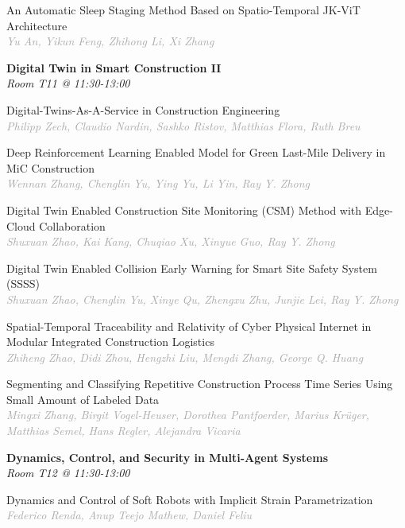 \begin{multicols*}{2}
\small An Automatic Sleep Staging Method Based on Spatio-Temporal JK-ViT Architecture\\ 
\footnotesize \textcolor{darkgray}{\textit{Yu An, Yikun  Feng, Zhihong  Li, Xi  Zhang}}

\normalsize \textbf{Digital Twin in Smart Construction II}\\
\small \textit{Room T11 @ 11:30-13:00}

\small Digital-Twins-As-A-Service in Construction Engineering\\ 
\footnotesize \textcolor{darkgray}{\textit{Philipp Zech, Claudio  Nardin, Sashko  Ristov, Matthias  Flora, Ruth  Breu}}

\small Deep Reinforcement Learning Enabled Model for Green Last-Mile Delivery in MiC Construction\\ 
\footnotesize \textcolor{darkgray}{\textit{Wennan Zhang, Chenglin  Yu, Ying  Yu, Li  Yin, Ray Y.  Zhong}}

\small Digital Twin Enabled Construction Site Monitoring (CSM) Method with Edge-Cloud Collaboration\\ 
\footnotesize \textcolor{darkgray}{\textit{Shuxuan Zhao, Kai  Kang, Chuqiao  Xu, Xinyue  Guo, Ray Y.  Zhong}}

\small Digital Twin Enabled Collision Early Warning for Smart Site Safety System (SSSS)\\ 
\footnotesize \textcolor{darkgray}{\textit{Shuxuan Zhao, Chenglin  Yu, Xinye  Qu, Zhengxu  Zhu, Junjie  Lei, Ray Y.  Zhong}}

\small Spatial-Temporal Traceability and Relativity of Cyber Physical Internet in Modular Integrated Construction Logistics\\ 
\footnotesize \textcolor{darkgray}{\textit{Zhiheng Zhao, Didi  Zhou, Hengzhi  Liu, Mengdi  Zhang, George Q.  Huang}}

\small Segmenting and Classifying Repetitive Construction Process Time Series Using Small Amount of Labeled Data\\ 
\footnotesize \textcolor{darkgray}{\textit{Mingxi Zhang, Birgit  Vogel-Heuser, Dorothea  Pantfoerder, Marius  Krüger, Matthias  Semel, Hans  Regler, Alejandra  Vicaria}}

\normalsize \textbf{Dynamics, Control, and Security in Multi-Agent Systems}\\
\small \textit{Room T12 @ 11:30-13:00}

\small Dynamics and Control of Soft Robots with Implicit Strain Parametrization\\ 
\footnotesize \textcolor{darkgray}{\textit{Federico Renda, Anup Teejo  Mathew, Daniel  Feliu}}


\end{multicols*}
